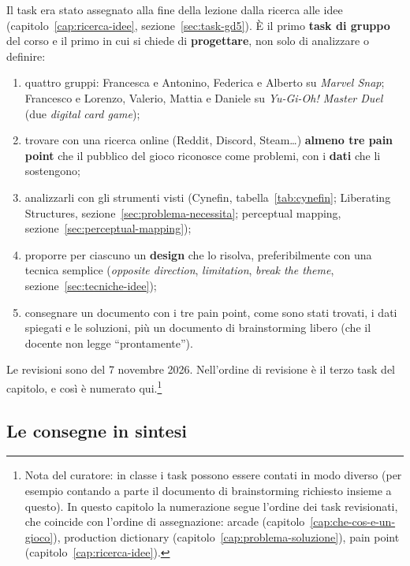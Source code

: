 Il task era stato assegnato alla fine della lezione dalla ricerca alle idee
(capitolo~\ref{cap:ricerca-idee}, sezione~\ref{sec:task-gd5}). È il primo
\textbf{task di gruppo} del corso e il primo in cui si chiede di
\textbf{progettare}, non solo di analizzare o definire:
\begin{enumerate}
  \item quattro gruppi: Francesca e Antonino, Federica e Alberto su
        \emph{Marvel Snap}; Francesco e Lorenzo, Valerio, Mattia e Daniele
        su \emph{Yu-Gi-Oh! Master Duel} (due \emph{digital card game});
  \item trovare con una ricerca online (Reddit, Discord, Steam\dots)
        \textbf{almeno tre pain point} che il pubblico del gioco riconosce
        come problemi, con i \textbf{dati} che li sostengono;
  \item analizzarli con gli strumenti visti (Cynefin,
        tabella~\ref{tab:cynefin}; Liberating Structures,
        sezione~\ref{sec:problema-necessita}; perceptual mapping,
        sezione~\ref{sec:perceptual-mapping});
  \item proporre per ciascuno un \textbf{design} che lo risolva,
        preferibilmente con una tecnica semplice (\emph{opposite direction},
        \emph{limitation}, \emph{break the theme},
        sezione~\ref{sec:tecniche-idee});
  \item consegnare un documento con i tre pain point, come sono stati
        trovati, i dati spiegati e le soluzioni, più un documento di
        brainstorming libero (che il docente non legge ``prontamente'').
\end{enumerate}
Le revisioni sono del 7 novembre 2026. Nell'ordine di revisione è il terzo
task del capitolo, e così è numerato qui.\footnote{Nota del curatore: in
classe i task possono essere contati in modo diverso (per esempio contando a
parte il documento di brainstorming richiesto insieme a questo). In questo
capitolo la numerazione segue l'ordine dei task revisionati, che coincide
con l'ordine di assegnazione: arcade (capitolo~\ref{cap:che-cos-e-un-gioco}),
production dictionary (capitolo~\ref{cap:problema-soluzione}), pain point
(capitolo~\ref{cap:ricerca-idee}).}

\subsection{Le consegne in sintesi}

